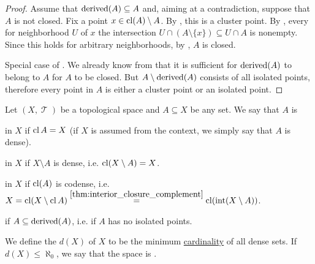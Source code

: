 \begin{proof}
   Assume that \( \operatorname{derived}(A) \subseteq A \) and, aiming at a contradiction, suppose that \( A \) is not closed. Fix a point \( x \in \operatorname{cl}(A) \setminus A \). By , this is a cluster point. By , every for neighborhood \( U \) of \( x \) the intersection \( U \cap (A \setminus \{ x \}) \subseteq U \cap A \) is nonempty. Since this holds for arbitrary neighborhoods, by , \( A \) is closed.

  Special case of .
   We already know from  that it is sufficient for \( \operatorname{derived}(A) \) to belong to \( A \) for \( A \) to be closed. But \( A \setminus \operatorname{derived}(A) \) consists of all isolated points, therefore every point in \( A \) is either a cluster point or an isolated point.
\end{proof}

\begin{definition}\label{def:topologically_dense_set}
  Let \( (X, \mscrT) \) be a topological space and \( A \subseteq X \) be any set. We say that \( A \) is

  \begin{DefEnum}
      in \( X \) if \( \operatorname{cl}{A} = X \) (if \( X \) is assumed from the context, we simply say that \( A \) is dense).

      in \( X \) if \( X \setminus A \) is dense, i.e. \( \operatorname{cl}(X \setminus A) = X \).

      in \( X \) if \( \operatorname{cl}(A) \) is codense, i.e. \( X = \operatorname{cl}(X \setminus \operatorname{cl} A) \overset {\ref{thm:interior_closure_complement}} = \operatorname{cl}(\operatorname{int}(X \setminus A)) \).

      if \( A \subseteq \operatorname{derived}(A) \), i.e. if \( A \) has no isolated points.
  \end{DefEnum}

  We define the  \( d(X) \) of \( X \) to be the minimum \hyperref[def:cardinal]{cardinality} of all dense sets. If \( d(X) \leq \aleph_0 \), we say that the space is .
\end{definition}

